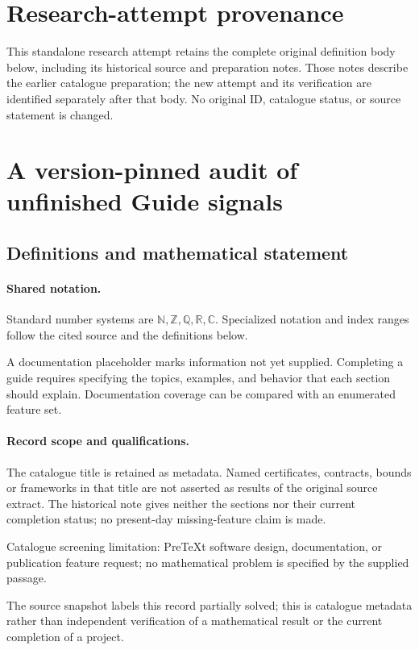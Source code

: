 \documentclass[11pt]{article}
\begin{document}
\section*{Research-attempt provenance}
This standalone research attempt retains the complete original definition body below,
including its historical source and preparation notes. Those notes describe the
earlier catalogue preparation; the new attempt and its verification are identified
separately after that body. No original ID, catalogue status, or source statement is changed.

\section{A version-pinned audit of unfinished Guide signals}\label{statement}

\subsection{Definitions and mathematical statement}

\paragraph{Shared notation.}Standard number systems are $\mathbb N,\mathbb Z,\mathbb Q,\mathbb R,\mathbb C$. Specialized notation and index ranges follow the cited source and the definitions below.


A documentation placeholder marks information not yet supplied. Completing a guide requires specifying the topics, examples, and behavior that each section should explain. Documentation coverage can be compared with an enumerated feature set.
\paragraph{Record scope and qualifications.}
The catalogue title is retained as metadata. Named certificates, contracts, bounds or frameworks in that title are not asserted as results of the original source extract.
The historical note gives neither the sections nor their current completion status; no present-day missing-feature claim is made.

Catalogue screening limitation: PreTeXt software design, documentation, or publication feature request; no mathematical problem is specified by the supplied passage.

The source snapshot labels this record partially solved; this is catalogue metadata rather than independent verification of a mathematical result or the current completion of a project.
\end{document}
